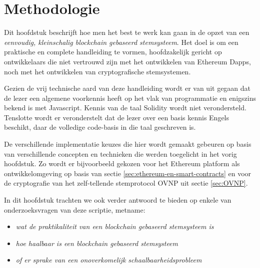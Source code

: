 
\chapter{Methodologie}
\label{ch:methodologie}

Dit hoofdstuk beschrijft hoe men het best te werk kan gaan in de opzet van een \textit{eenvoudig, kleinschalig blockchain gebaseerd stemsysteem}. Het doel is om een praktische en complete handleiding te vormen, hoofdzakelijk gericht op ontwikkelaars die niet vertrouwd zijn met het ontwikkelen van Ethereum Dapps, noch met het ontwikkelen van cryptografische stemsystemen. 

Gezien de vrij technische aard van deze handleiding wordt er van uit gegaan dat de lezer een algemene voorkennis heeft op het vlak van programmatie en enigszins bekend is met Javascript. Kennis van de taal Solidity wordt niet verondersteld. Tenslotte wordt er veronderstelt dat de lezer over een basis kennis Engels beschikt, daar de volledige code-basis in die taal geschreven is. 

De  verschillende implementatie keuzes die hier wordt gemaakt gebeuren op basis van verschillende concepten en technieken die werden toegelicht in het vorig hoofdstuk. Zo wordt er bijvoorbeeld gekozen voor het Ethereum platform als ontwikkelomgeving op basis van sectie \ref{sec:ethereum-en-smart-contracts} en voor de cryptografie van het zelf-tellende stemprotocol OVNP \autocite{McCorry2017} uit sectie \ref{sec:OVNP}.

In dit hoofdstuk trachten we ook verder antwoord te bieden op enkele van onderzoeksvragen van deze scriptie, metname: 
\begin{itemize}
	\item \textit{wat de praktikaliteit van een blockchain gebaseerd stemsysteem is}
	\item \textit{hoe haalbaar is een blockchain gebaseerd stemsysteem} 
	\item \textit{of er sprake van een onoverkomelijk schaalbaarheidsprobleem}
\end{itemize}

